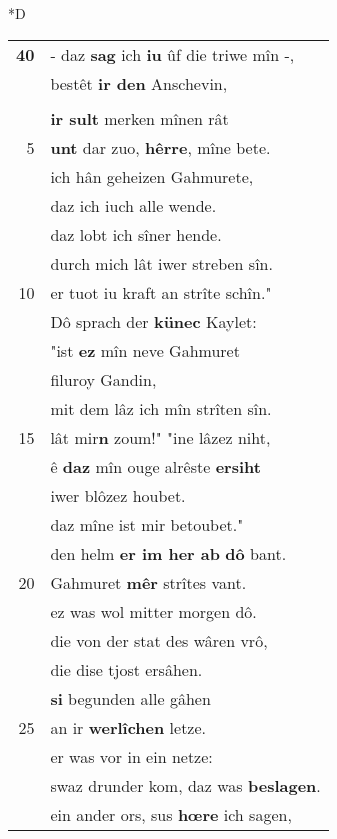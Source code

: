 \documentclass[8pt,a4paper,notitlepage]{article}
\begin{document}
\begin{table}[ht]
\begin{minipage}[t]{0.5\linewidth}
\small
\begin{center}*D
\end{center}
\begin{tabular}{rl}
\textbf{40} & - daz \textbf{sag} ich \textbf{iu} ûf die triwe mîn -,\\ 
 & bestêt \textbf{ir den} Anschevin,\\ 
 & \textit{\begin{large}D\end{large}}er mîne sicherheit dort hât.\\ 
 & \textbf{ir sult} merken mînen rât\\ 
5 & \textbf{unt} dar zuo, \textbf{hêrre}, mîne bete.\\ 
 & ich hân geheizen Gahmurete,\\ 
 & daz ich iuch alle wende.\\ 
 & daz lobt ich sîner hende.\\ 
 & durch mich lât iwer streben sîn.\\ 
10 & er tuot iu kraft an strîte schîn."\\ 
 & Dô sprach der \textbf{künec} Kaylet:\\ 
 & "ist \textbf{ez} mîn neve Gahmuret\\ 
 & filuroy Gandin,\\ 
 & mit dem lâz ich mîn strîten sîn.\\ 
15 & lât mir\textbf{n} zoum!" "ine lâzez niht,\\ 
 & ê \textbf{daz} mîn ouge alrêste \textbf{ersiht}\\ 
 & iwer blôzez houbet.\\ 
 & daz mîne ist mir betoubet."\\ 
 & den helm \textbf{er im her ab} \textbf{dô} bant.\\ 
20 & Gahmuret \textbf{mêr} strîtes vant.\\ 
 & ez was wol mitter morgen dô.\\ 
 & die von der stat des wâren vrô,\\ 
 & die dise tjost ersâhen.\\ 
 & \textbf{si} begunden alle gâhen\\ 
25 & an ir \textbf{werlîchen} letze.\\ 
 & er was vor in ein netze:\\ 
 & swaz drunder kom, daz was \textbf{beslagen}.\\ 
 & ein ander ors, sus \textbf{hœre} ich sagen,\\ 

\end{tabular}
\end{minipage}
\end{table}
\end{document}
